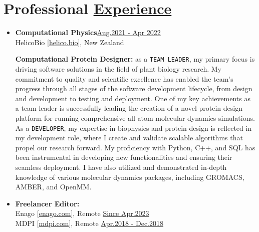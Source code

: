 
\section{Professional \href{.}{Experience}}

\begin{itemize}


    \item {\bf Computational Physics}\hfill \href{.}{Aug.2021 - Apr 2022}\\
          HelicoBio [\href{www.helico.bio}{helico.bio}],
          New Zealand

              {\noindent
                  \textbf{Computational Protein Designer:}
                  as a \texttt{TEAM LEADER}, my primary focus is driving software solutions in the field of plant biology research. My commitment to quality and scientific excellence has enabled the team's progress through all stages of the software development lifecycle, from design and development to testing and deployment. One of my key achievements as a team leader is successfully leading the creation of a novel protein design platform for running comprehensive all-atom molecular dynamics simulations.
                  As a \texttt{DEVELOPER}, my expertise in biophysics and protein design is reflected in my development role, where I create and validate scalable algorithms that propel our research forward. My proficiency with Python, C++, and SQL has been instrumental in developing new functionalities and ensuring their seamless deployment. I have also utilized and demonstrated in-depth knowledge of various molecular dynamics packages, including GROMACS, AMBER, and OpenMM.
              }

    \item {\bf Freelancer Editor:}\\
          Enago [\href{https://www.enago.com/}{enago.com}], Remote \hfill
          \href{.}{Since Apr.2023}\\
          MDPI [\href{https://www.mdpi.com/}{mdpi.com}], Remote \hfill
          \href{.}{Apr.2018 - Dec.2018}


\end{itemize}
